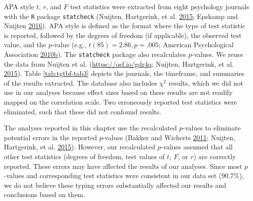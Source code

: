 \documentclass[a5paper]{book}
\begin{document}
APA style \(t\), \(r\), and \(F\) test statistics were extracted from
eight psychology journals with the \texttt{R} package \texttt{statcheck}
(Nuijten, Hartgerink, et al.
\protect\hyperlink{ref-doi:10.3758ux2fs13428-015-0664-2}{2015}; Epskamp
and Nuijten \protect\hyperlink{ref-statcheck}{2016}). APA style is
defined as the format where the type of test statistic is reported,
followed by the degrees of freedom (if applicable), the observed test
value, and the \(p\)-value (e.g., \(t(85)=2.86, p=.005\); American
Psychological Association
\protect\hyperlink{ref-isbn:9781433805615}{2010}\protect\hyperlink{ref-isbn:9781433805615}{b}).
The \texttt{statcheck} package also recalculates \(p\)-values. We reuse
the data from Nuijten et al. (\url{https://osf.io/gdr4q}; Nuijten,
Hartgerink, et al.
\protect\hyperlink{ref-doi:10.3758ux2fs13428-015-0664-2}{2015}). Table
\ref{tab:tgtbf-tab3} depicts the journals, the timeframe, and summaries
of the results extracted. The database also includes \(\chi^2\) results,
which we did not use in our analyses because effect sizes based on these
results are not readily mapped on the correlation scale. Two erroneously
reported test statistics were eliminated, such that these did not
confound results.

The analyses reported in this chapter use the recalculated \(p\)-values
to eliminate potential errors in the reported \(p\)-values (Bakker and
Wicherts \protect\hyperlink{ref-doi:10.3758ux2fs13428-011-0089-5}{2011};
Nuijten, Hartgerink, et al.
\protect\hyperlink{ref-doi:10.3758ux2fs13428-015-0664-2}{2015}).
However, our recalculated \(p\)-values assumed that all other test
statistics (degrees of freedom, test values of \(t\), \(F\), or \(r\))
are correctly reported. These errors may have affected the results of
our analyses. Since most \(p\)-values and corresponding test statistics
were consistent in our data set (90.7\%), we do not believe these typing
errors substantially affected our results and conclusions based on them.
\end{document}
